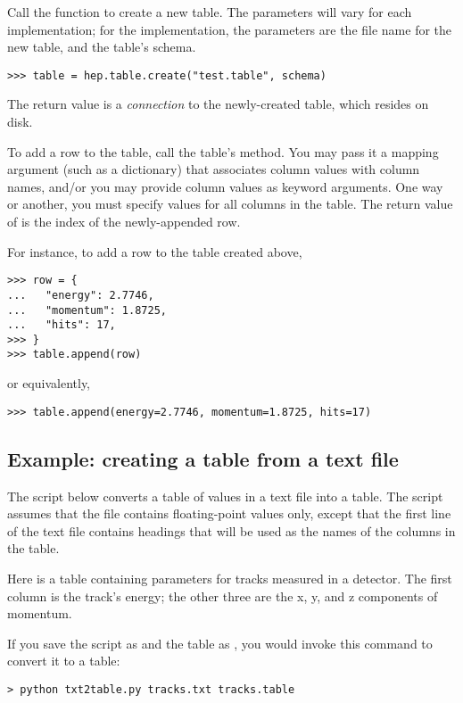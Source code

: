 Call the  function to create a new table.  The
parameters will vary for each implementation; for the 
implementation, the parameters are the file name for the new table, and
the table's schema.  
\begin{verbatim}
>>> table = hep.table.create("test.table", schema)
\end{verbatim}
The return value is a \emph{connection} to the newly-created table,
which resides on disk.

To add a row to the table, call the table's  method.  You
may pass it a mapping argument (such as a dictionary) that associates
column values with column names, and/or you may provide column values as
keyword arguments.  One way or another, you must specify values for all
columns in the table.  The return value of  is the index
of the newly-appended row.

For instance, to add a row to the table created above,
\begin{verbatim}
>>> row = {
...   "energy": 2.7746,
...   "momentum": 1.8725,
...   "hits": 17,
>>> }
>>> table.append(row)
\end{verbatim}
or equivalently,
\begin{verbatim}
>>> table.append(energy=2.7746, momentum=1.8725, hits=17)
\end{verbatim}

\subsection{Example: creating a table from a text file}

The script below converts a table of values in a text file into a
\pyhep table.  The script assumes that the file contains floating-point
values only, except that the first line of the text file contains
headings that will be used as the names of the columns in the table.

Here is a table containing parameters for tracks measured in a
detector.  The first column is the track's energy; the other three are
the x, y, and z components of momentum.

If you save the script as  and the table as
, you would invoke this command to convert it to a
table: 
\begin{verbatim}
> python txt2table.py tracks.txt tracks.table
\end{verbatim}

